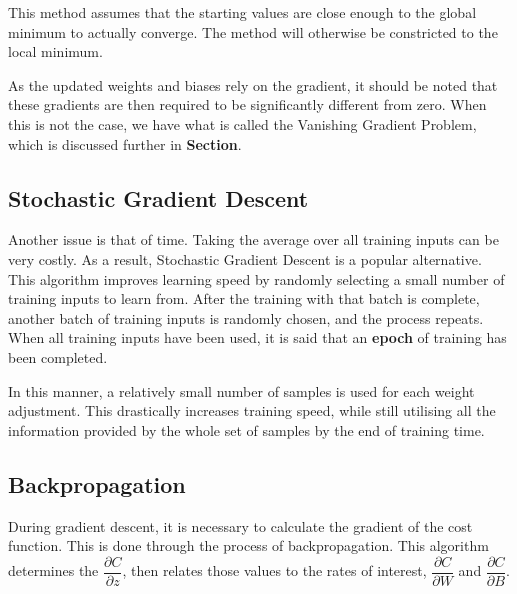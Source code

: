 \documentclass[honours,12pt]{unswthesis}
\numberwithin{equation}{section}
\begin{document}
This method assumes that the starting values are close enough to the global minimum to actually converge. The method will otherwise be constricted to the local minimum.

As the updated weights and biases rely on the gradient, it should be noted that these gradients are then required to be significantly different from zero. When this is not the case, we have what is called the Vanishing Gradient Problem, which is discussed further in \textbf{Section}.

\subsection{Stochastic Gradient Descent}\label{nnets-stochgraddesc}

Another issue is that of time. Taking the average over all training inputs can be very costly. As a result, Stochastic Gradient Descent is a popular alternative. This algorithm improves learning speed by randomly selecting a small number of training inputs to learn from. After the training with that batch is complete, another batch of training inputs is randomly chosen, and the process repeats. When all training inputs have been used, it is said that an \textbf{epoch} of training has been completed.

In this manner, a relatively small number of samples is used for each weight adjustment. This drastically increases training speed, while still utilising all the information provided by the whole set of samples by the end of training time.

%
%
%


\subsection{Backpropagation}

During gradient descent, it is necessary to calculate the gradient of the cost function. This is done through the process of backpropagation. This algorithm determines the $\dfrac{\partial C}{\partial z}$, then relates those values to the rates of interest, $\dfrac{\partial C}{\partial W}$ and $\dfrac{\partial C}{\partial B}$.
\end{document}
